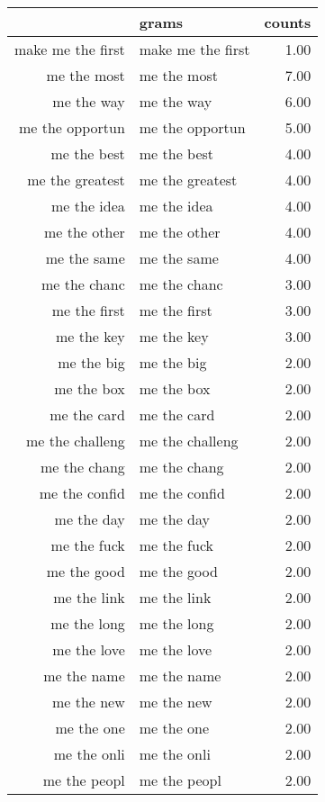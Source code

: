 \begin{table}[ht]
\centering
\begin{tabular}{rlr}
  \hline
 & grams & counts \\ 
  \hline
make me the first & make me the first & 1.00 \\ 
  me the most & me the most & 7.00 \\ 
  me the way & me the way & 6.00 \\ 
  me the opportun & me the opportun & 5.00 \\ 
  me the best & me the best & 4.00 \\ 
  me the greatest & me the greatest & 4.00 \\ 
  me the idea & me the idea & 4.00 \\ 
  me the other & me the other & 4.00 \\ 
  me the same & me the same & 4.00 \\ 
  me the chanc & me the chanc & 3.00 \\ 
  me the first & me the first & 3.00 \\ 
  me the key & me the key & 3.00 \\ 
  me the big & me the big & 2.00 \\ 
  me the box & me the box & 2.00 \\ 
  me the card & me the card & 2.00 \\ 
  me the challeng & me the challeng & 2.00 \\ 
  me the chang & me the chang & 2.00 \\ 
  me the confid & me the confid & 2.00 \\ 
  me the day & me the day & 2.00 \\ 
  me the fuck & me the fuck & 2.00 \\ 
  me the good & me the good & 2.00 \\ 
  me the link & me the link & 2.00 \\ 
  me the long & me the long & 2.00 \\ 
  me the love & me the love & 2.00 \\ 
  me the name & me the name & 2.00 \\ 
  me the new & me the new & 2.00 \\ 
  me the one & me the one & 2.00 \\ 
  me the onli & me the onli & 2.00 \\ 
  me the peopl & me the peopl & 2.00 \\ 

\end{tabular}
\end{table}
